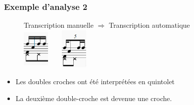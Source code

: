 \subsubsection{Exemple d’analyse 2}
\begin{figure}[h]
	\centering
	\tab Transcription manuelle $\Rightarrow$ Transcription automatique\\
	\includegraphics[height=20mm, width=13mm]{z_images/4_experimentations/1_analyse_midi_audio/0_drummer1_session3/5_manuelle.png}\ \ \ \ 
	\includegraphics[height=20mm, width=13mm]{z_images/4_experimentations/1_analyse_midi_audio/0_drummer1_session3/4_musescore.png}
\end{figure}
\begin{itemize}
	\item Les doubles croches ont été interprétées en quintolet
	\item La deuxième double-croche est devenue une croche.\\
\end{itemize}
